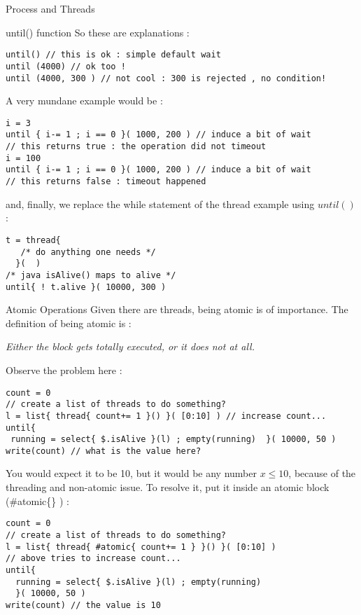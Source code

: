 \begin{section}{Process and Threads}
\begin{subsection}{until() function}
So these are explanations :

\begin{lstlisting}[style=JexlStyle]
until() // this is ok : simple default wait  
until (4000) // ok too !
until (4000, 300 ) // not cool : 300 is rejected , no condition!
\end{lstlisting}       

A very mundane example would be :

\begin{lstlisting}[style=JexlStyle]
i = 3 
until { i-= 1 ; i == 0 }( 1000, 200 ) // induce a bit of wait 
// this returns true : the operation did not timeout 
i = 100 
until { i-= 1 ; i == 0 }( 1000, 200 ) // induce a bit of wait 
// this returns false : timeout happened  
\end{lstlisting}       

and, finally, we replace the while statement 
of the thread example using $until()$ :

\begin{lstlisting}[style=JexlStyle]
t = thread{  
   /* do anything one needs */
  }(  )
/* java isAlive() maps to alive */
until{ ! t.alive }( 10000, 300 )
\end{lstlisting}
\end{subsection}

\begin{subsection}{Atomic Operations}
Given there are threads, being atomic is of importance.
The definition of being atomic is :
\begin{center}\emph{Either the block gets totally executed, or it does not at all. }\end{center}
Observe the problem here :

\begin{lstlisting}[style=JexlStyle]
count = 0 
// create a list of threads to do something?
l = list{ thread{ count+= 1 }() }( [0:10] ) // increase count...
until{ 
 running = select{ $.isAlive }(l) ; empty(running)  }( 10000, 50 )
write(count) // what is the value here?
\end{lstlisting}

You would expect it to be 10, but it would be any number $x \le 10$,
because of the threading and non-atomic issue. To resolve it, 
put it inside an atomic block (\#atomic\{\} ) : 

\begin{center}\begin{minipage}{\linewidth}
\begin{lstlisting}[style=JexlStyle]
count = 0 
// create a list of threads to do something?
l = list{ thread{ #atomic{ count+= 1 } }() }( [0:10] ) 
// above tries to increase count...
until{ 
  running = select{ $.isAlive }(l) ; empty(running)  
  }( 10000, 50 )
write(count) // the value is 10
\end{lstlisting}
\end{minipage}\end{center}


\end{subsection}
\end{section}
